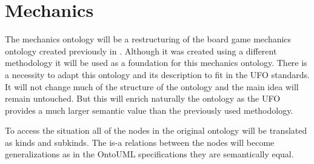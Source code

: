 \section{Mechanics}
The mechanics ontology will be a restructuring of the board game mechanics ontology created previously in \cite{kritz_buildingOntology}. Although it was created using a different methodology it will be used as a foundation for this mechanics ontology. There is a necessity to adapt this ontology and its description to fit in the UFO standards. It will not change much of the structure of the ontology and the main idea will remain untouched. But this will enrich naturally the ontology as the UFO provides a much larger semantic value than the previously used methodology.

To access the situation all of the nodes in the original ontology will be translated as kinds and subkinds. The is-a relations between the nodes will become generalizations as in the OntoUML specifications they are semantically equal.
